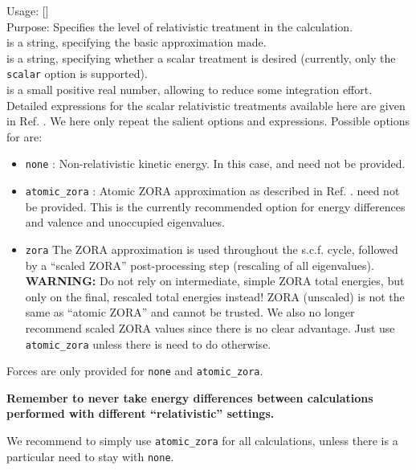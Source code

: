 {
  \noindent
  Usage:   
    [] \\[1.0ex]
  Purpose: Specifies the level of relativistic treatment in the
    calculation. \\[1.0ex]
   is a string, specifying the basic approximation
    made. \\
   is a string, specifying whether a scalar treatment
    is desired (currently, only the \texttt{scalar} option is
    supported). \\ 
   is a small positive real number, allowing to
    reduce some integration effort. \\
}
Detailed expressions for the scalar relativistic treatments available
here are given in Ref. \cite{Blum08}. We here only repeat the salient
options and expressions. Possible options for  are:
\begin{itemize}
  \item \texttt{none} : Non-relativistic kinetic energy. In this case,
         and  need not be provided. 
  \item \texttt{atomic\_zora} : Atomic ZORA approximation as described
    in Ref. \cite{Blum08}.  need not be provided. 
    This is the currently recommended option for energy differences and valence 
    and unoccupied eigenvalues.
  \item \texttt{zora} The ZORA approximation is used throughout the
    s.c.f. cycle, followed by a ``scaled ZORA'' \cite{Lenthe94} post-processing step
    (rescaling of all eigenvalues). \textbf{WARNING:} Do not rely on
    intermediate, simple ZORA total energies, but only on the final,
    rescaled total energies instead! ZORA (unscaled) is not the same as 
    ``atomic ZORA'' and cannot be trusted. We also no longer recommend
    scaled ZORA values since there is no clear advantage. Just use
    \texttt{atomic\_zora} unless there is need to do otherwise.
\end{itemize}
Forces are only provided for \texttt{none} and \texttt{atomic\_zora}.

\textbf{Remember to never take energy differences between calculations
  performed with different ``relativistic'' settings.}

We recommend to simply use \texttt{atomic\_zora} for all calculations,
unless there is a particular need to stay with 
\texttt{none}. 

